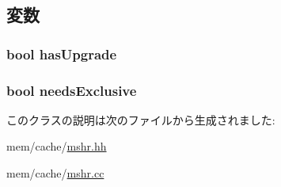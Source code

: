 \subsection{変数}
\hypertarget{classMSHR_1_1TargetList_afd770d45ac12adb106ed9873fd3b1509}{
\subsubsection[{hasUpgrade}]{\setlength{\rightskip}{0pt plus 5cm}bool {\bf hasUpgrade}}}
\label{classMSHR_1_1TargetList_afd770d45ac12adb106ed9873fd3b1509}
\hypertarget{classMSHR_1_1TargetList_a546082d646a7cf9bda71269184b937b9}{
\subsubsection[{needsExclusive}]{\setlength{\rightskip}{0pt plus 5cm}bool {\bf needsExclusive}}}
\label{classMSHR_1_1TargetList_a546082d646a7cf9bda71269184b937b9}


このクラスの説明は次のファイルから生成されました:\begin{DoxyCompactItemize}
\item 
mem/cache/\hyperlink{mshr_8hh}{mshr.hh}\item 
mem/cache/\hyperlink{mshr_8cc}{mshr.cc}\end{DoxyCompactItemize}

